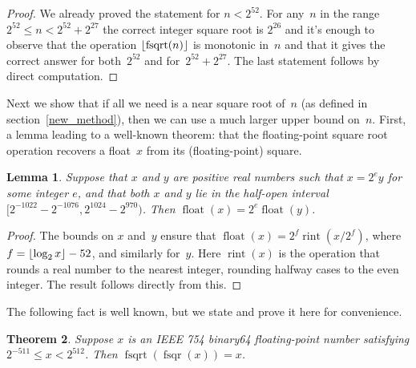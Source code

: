 \documentclass[a4paper]{article}
\DeclarePairedDelimiter\floor{\lfloor}{\rfloor}
\DeclareMathOperator{\fsqrt}{fsqrt}
\DeclareMathOperator{\fsqr}{fsqr}
\DeclareMathOperator{\float}{float}
\DeclareMathOperator{\rint}{rint}
\theoremstyle{plain}
\newtheorem{theorem}{Theorem}
\newtheorem{lemma}[theorem]{Lemma}
\theoremstyle{definition}
\begin{document}
\begin{proof}
  We already proved the statement for $n < 2^{52}$. For any~$n$ in the range
  $2^{52} \le n < 2^{52} + 2^{27}$ the correct integer square root is $2^{26}$
  and it's enough to observe that the operation $\floor{\fsqrt(n)}$ is
  monotonic in~$n$ and that it gives the correct answer for both~$2^{52}$ and
  for~$2^{52} + 2^{27}$. The last statement follows by direct computation.
\end{proof}

Next we show that if all we need is a near square root of~$n$ (as defined in
section~\ref{new_method}), then we can use a much larger upper bound on~$n$.
First, a lemma leading to a well-known theorem: that the floating-point
square root operation recovers a float~$x$ from its (floating-point) square.

\begin{lemma}\label{float_scale}
  Suppose that $x$ and $y$ are positive real numbers such that $x = 2^e y$ for
  some integer $e$, and that both $x$ and $y$ lie in the half-open interval
  $[2^{-1022} - 2^{-1076}, 2^{1024} - 2^{970})$. Then $\float(x) = 2^e
  \float(y)$.
\end{lemma}

\begin{proof}
  The bounds on $x$ and~$y$ ensure that $\float(x) = 2^f \rint(x / 2^f)$, where
  $f = \floor{\log_2 x} - 52$, and similarly for~$y$. Here $\rint(x)$ is the
  operation that rounds a real number to the nearest integer, rounding halfway
  cases to the even integer. The result follows directly from this.
\end{proof}

The following fact is well known, but we state and prove it here for
convenience.

\begin{theorem}\label{sqrt_of_sqr}
  Suppose $x$ is an IEEE 754 binary64 floating-point number satisfying
  $2^{-511} \le x < 2^{512}$. Then $\fsqrt(\fsqr(x)) = x$.
\end{theorem}
\end{document}

